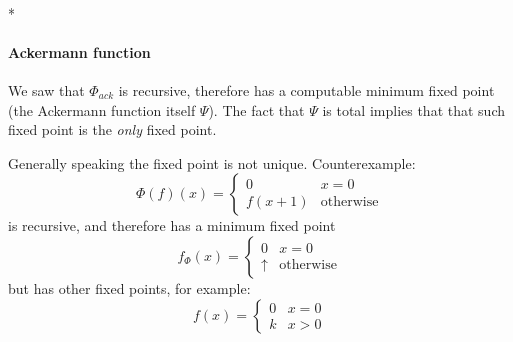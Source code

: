 \mbox{}\\*
\paragraph{\textbf{Ackermann function}}
We saw that $\Phi_{ack}$ is recursive, therefore has a computable
minimum fixed point (the Ackermann function itself $\Psi$). The fact
that $\Psi$ is total implies that that such fixed point is the
\emph{only} fixed point.


\begin{observation}
  Generally speaking the fixed point is not unique. Counterexample:
  \[
    \Phi(f)(x) = \begin{cases}
      0 & x=0 \\
      f(x+1) & \mbox{otherwise}
    \end{cases}
  \]
  is recursive, and therefore has a minimum fixed point
  \[
    f_\Phi(x) = \begin{cases}
      0 & x=0 \\
      \uparrow & \mbox{otherwise}
    \end{cases}
  \]
  but has other fixed points, for example:
  \[
    f(x) = \begin{cases}
      0 & x=0 \\
      k & x>0
    \end{cases}
  \]
\end{observation}
